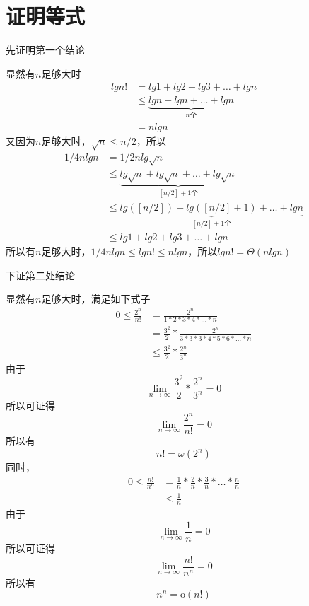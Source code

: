 \documentclass[cn,11pt,chinese]{elegantbook}
\begin{document}
\section{证明等式}

先证明第一个结论

  显然有$n$足够大时
  \begin{equation}
      \begin{aligned}
          lgn! &= lg1+lg2+lg3+\dots + lgn \\
                &\le \underbrace{lgn+lgn+\dots +lgn}_{n\mbox{个}} \\
                &= nlgn
      \end{aligned}
  \end{equation}
  又因为$n$足够大时，$\sqrt{n} \le n/2$，所以
  \begin{equation}
    \begin{aligned}
        1/4nlgn &= 1/2nlg\sqrt{n} \\
                &\le \underbrace{lg\sqrt{n}+lg\sqrt{n}+\dots +lg\sqrt{n}}_{[n/2]+1\mbox{个}} \\
                &\le \underbrace{lg([n/2])+lg([n/2]+1)+\dots +lgn}_{[n/2]+1\mbox{个}}\\
                &\le lg1+lg2+lg3+\dots +lgn
    \end{aligned}
  \end{equation}
  所以有$n$足够大时，$1/4nlgn \le lgn! \le nlgn$，所以$lgn! = \Theta (nlgn)$

下证第二处结论

  显然有$n$足够大时，满足如下式子
  \begin{equation}
    \begin{aligned}
        0\le \frac{2^n}{n!} &= \frac{2^n}{1*2*3*4*\dots *n}\\ 
                         &=\frac{3^2}{2} *\frac{2^n}{3*3*3*4*5*6*\dots *n}\\
                         &\le \frac{3^2}{2} *\frac{2^n}{3^n} 
    \end{aligned}
  \end{equation}
  由于
  $$\lim_{n\rightarrow \infty} \frac{3^2}{2} *\frac{2^n}{3^n} = 0$$
  所以可证得
  $$\lim_{n\rightarrow \infty} \frac{2^n}{n!} = 0$$
  所以有
  $$n! = \omega (2^n)$$
  同时，
  \begin{equation}
    \begin{aligned}
        0\le \frac{n!}{n^n} &= \frac{1}{n} * \frac{2}{n} * \frac{3}{n} * \dots * \frac{n}{n} \\ 
                          &\le \frac{1}{n}
    \end{aligned}
  \end{equation}
  由于
  $$\lim_{n\rightarrow \infty} \frac{1}{n} = 0$$
  所以可证得
  $$\lim_{n\rightarrow \infty} \frac{n!}{n^n} = 0$$
  所以有
  $$n^n = \mathrm{o} (n!)$$
\end{document}
